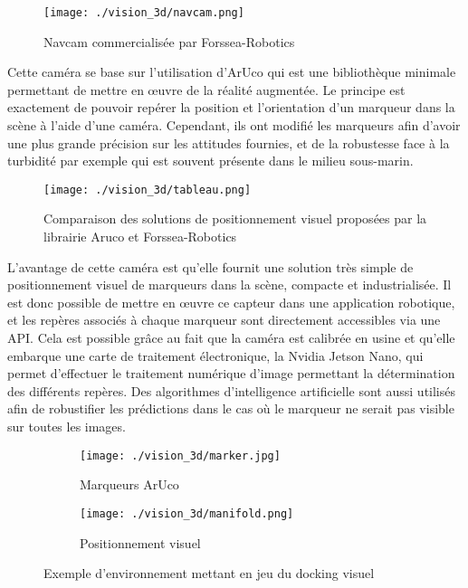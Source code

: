     \begin{figure}[!htb]
        \centering
        \texttt{[image: ./vision\_3d/navcam.png]}
        \caption{Navcam commercialisée par Forssea-Robotics}
        \label{fig:navcam}
    \end{figure}

    Cette caméra se base sur l’utilisation d’ArUco qui est une bibliothèque minimale permettant de mettre en œuvre de la réalité augmentée. Le principe est exactement de pouvoir repérer la position et l’orientation d’un marqueur dans la scène à l’aide d’une caméra. Cependant, ils ont modifié les marqueurs afin d’avoir une plus grande précision sur les attitudes fournies, et de la robustesse face à la turbidité par exemple qui est souvent présente dans le milieu sous-marin.

    \begin{figure}[!htb]
        \centering
        \texttt{[image: ./vision\_3d/tableau.png]}
        \caption{Comparaison des solutions de positionnement visuel proposées par la librairie Aruco et Forssea-Robotics}
        \label{fig:navcam}
    \end{figure}

    L’avantage de cette caméra est qu’elle fournit une solution très simple de positionnement visuel de marqueurs dans la scène, compacte et industrialisée. Il est donc possible de mettre en œuvre ce capteur dans une application robotique, et les repères associés à chaque marqueur sont directement accessibles via une API. Cela est possible grâce au fait que la caméra est calibrée en usine et qu’elle embarque une carte de traitement électronique, la Nvidia Jetson Nano, qui permet d’effectuer le traitement numérique d’image permettant la détermination des différents repères. Des algorithmes d’intelligence artificielle sont aussi utilisés afin de robustifier les prédictions dans le cas où le marqueur ne serait pas visible sur toutes les images.

    \begin{figure}[!htb]
        \centering
        \begin{subfigure}[b]{0.3\textwidth}
            \centering
            \texttt{[image: ./vision\_3d/marker.jpg]}
            \caption{Marqueurs ArUco}
            \label{fig:marker}
        \end{subfigure}
        \hfill
        \begin{subfigure}[b]{0.6\textwidth}
            \centering
            \texttt{[image: ./vision\_3d/manifold.png]}
            \caption{Positionnement visuel}
            \label{fig:manifold}
        \end{subfigure}
        \caption{Exemple d'environnement mettant en jeu du docking visuel}
        \label{fig:environnement}
    \end{figure}

